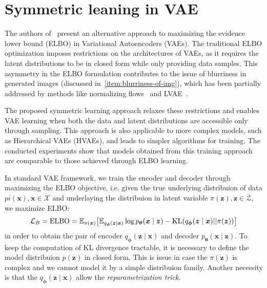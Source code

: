 \section{Symmetric leaning in VAE}
\label{sec:symmetric_learning}
The authors of~\cite{sym-learning-2023} present an alternative approach to maximizing the evidence lower bound (ELBO)
in Variational Autoencoders (VAEs). The traditional ELBO optimization imposes restrictions on the architectures of 
VAEs, as it requires the latent distributions to be in closed form while only providing data samples. This asymmetry in
the ELBO formulation contributes to the issue of blurriness in generated images (discussed in~\ref{item:blurriness-of-img}),
which has been partially addressed by methods like normalizing flows~\cite{nf-2015} and LVAE~\cite{lvae-2016}.

The proposed symmetric learning approach relaxes these restrictions and enables VAE learning when both the data and 
latent distributions are accessible only through sampling. This approach is also applicable to more complex models, such 
as Hierarchical VAEs (HVAEs), and leads to simpler algorithms for training. The conducted experiments show that models obtained 
from this training approach are comparable to those achieved through ELBO learning.

In standard VAE framework, we train the encoder  and decoder through maximizing the ELBO objective, i.e.
given the true underlying distribuion of data $pi(\boldsymbol{x}), \boldsymbol{x} \in \mathcal{X}$ and underlaying
the distribuion in latent variable $\pi(\boldsymbol{z}), \boldsymbol{z} \in \mathcal{Z}$, we maximize ELBO:
$$
\mathcal{L}_{B} = \mathrm{ELBO} = \operatorname{\mathbb{E}}_{\pi(\boldsymbol{x})} \bigl[ \operatorname{\mathbb{E}}_{q_{\boldsymbol{\phi}}(\boldsymbol{z} \mid \boldsymbol{x})} 
\log p_{\boldsymbol{\theta}}(\boldsymbol{x} \mid \boldsymbol{z}) - \mathrm{KL} (q_{\boldsymbol{\phi}}(\boldsymbol{z} \mid \boldsymbol{x}) || 
\pi(\boldsymbol{z})) \bigr]
$$
in order to obtain the pair of encoder $q_{\boldsymbol{\phi}}(\boldsymbol{z} \mid \boldsymbol{x})$ and decoder
$p_{\boldsymbol{\theta}}(\boldsymbol{x} \mid \boldsymbol{z})$. To keep the computation of KL divergence tractable, it is necessary to define
the model distribuion $p(\boldsymbol{z})$ in closed form. This is issue in case the $\pi(\boldsymbol{z})$ is complex and we cannot model 
it by a simple distribuion family. Another necessity is that the $q_{\boldsymbol{\phi}}(\boldsymbol{z} \mid \boldsymbol{x})$ allow the 
\textit{reparametrization trick}. 

